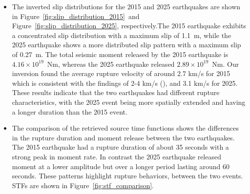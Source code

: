 \begin{itemize}[label=--,itemsep=2pt, topsep=0pt]



    \item The inverted slip distributions for the 2015 and 2025 earthquakes are shown in Figure~\ref{fig:slip_distribution_2015}\
     and Figure~\ref{fig:slip_distribution_2025}, respectively.The 2015 earthquake exhibits a concentrated slip distribution with 
     a maximum slip of 1.1~m, while the 2025 earthquake shows 
    a more distributed slip pattern with a maximum slip of 0.27~m. The total seismic moment released by the 2015 earthquake
    is $4.16 \times 10^{19}$~Nm, whereas the 2025 earthquake released $2.89 \times 10^{19}$~Nm. Our inversion found the average 
    rupture velocity of around 2.7 km/s for 2015 which is consistent with the findings of 2-4 km/s (\citeA{Aderhold2016}), and 
    3.1 km/s for 2025. These results indicate that the two earthquakes had different rupture characteristics, with the 2025 event
    being more spatially extended and having a longer duration than the 2015 event.
    \item The comparison of the retrieved source time functions shows the differences in the rupture duration and moment release between the two earthquakes. The 2015
     earthquake had a rupture duration of about 35 seconds with a strong peak in moment rate. In contrast the 2025 earthquake released
      moment at a lower amplitude but over a longer period lasting around 60 seconds. These patterns highlight rupture behaviors, 
      between the two events. STFs are shown in Figure~\ref{fig:stf_comparison}.


\end{itemize}
